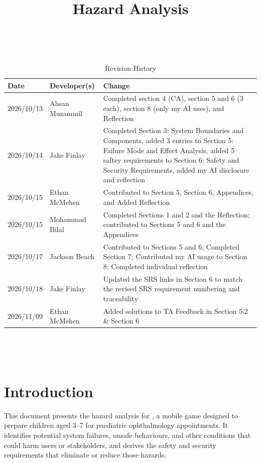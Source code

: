 \documentclass{article}
\title{Hazard Analysis\\\progname}
\author{\authname}
\date{}
\newcounter{hazard}
\begin{document}
\maketitle
\thispagestyle{empty}

~\newpage


\begin{table}[hp]
\caption{Revision History} \label{TblRevisionHistory}
\begin{tabularx}{\textwidth}{llX}
\toprule
\textbf{Date} & \textbf{Developer(s)} & \textbf{Change}\\
\midrule
2026/10/13 & Ahsan Muzammil & Completed section 4 (CA), section 5 and 6 (3 each), section 8 (only my AI uses), and Reflection\\
2026/10/14 & Jake Finlay & Completed Section 3: System Boundaries and
Components, added 3 entries to Section 5: Failure Mode and Effect Analysis,
added 5 saftey requirements to Section 6: Safety and Security Requirements,
added my AI disclosure and reflection \\
2026/10/15 & Ethan McMehen & Contributed to Section 5, Section 6, Appendices, and Added Reflection \\
2026/10/15 & Mohammad Bilal & Completed Sections 1 and 2 and the Reflection; contributed to Sections 5 and 6 and the Appendices \\
2026/10/17 & Jackson Beach & Contributed to Sections 5 and 6; Completed Section 7; Contributed my AI usage to Section 8; Completed individual reflection \\
2026/10/18 & Jake Finlay & Updated the SRS links in Section 6 to match the
revised SRS requirement numbering and traceability \\
2026/11/09 & Ethan McMehen & Added solutions to TA Feedback in Section 5.2 \& Section 6 \\
\bottomrule
\end{tabularx}
\end{table}

~\newpage

\tableofcontents

~\newpage


\section{Introduction}
\label{sec_Introduction}

This document presents the hazard analysis for \progname{}, a mobile game
designed to prepare children aged 3--7 for paediatric ophthalmology appointments.
It identifies potential system failures, unsafe behaviours, and other
conditions that could harm users or stakeholders,
and derives the safety and security requirements that eliminate or
reduce those hazards.
\end{document}
